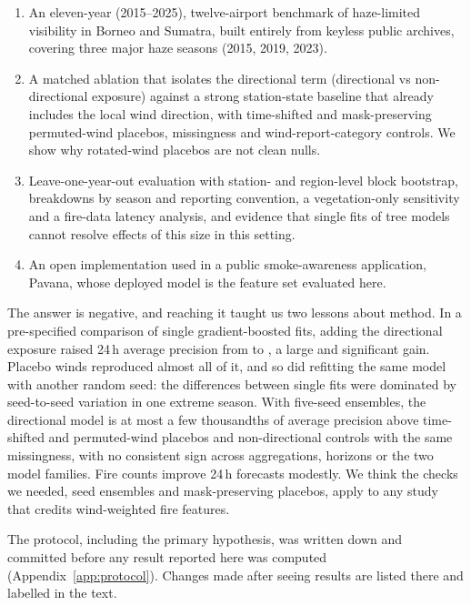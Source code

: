 \begin{enumerate}
  \item An eleven-year (2015--2025), twelve-airport benchmark of haze-limited visibility in Borneo
        and Sumatra, built entirely from keyless public archives, covering three major haze
        seasons (2015, 2019, 2023).
  \item A matched ablation that isolates the directional term (directional vs non-directional
        exposure) against a strong station-state baseline that already includes the local wind
        direction, with time-shifted and mask-preserving permuted-wind placebos, missingness and
        wind-report-category controls. We show why rotated-wind placebos are not clean nulls.
  \item Leave-one-year-out evaluation with station- and region-level block bootstrap, breakdowns by
        season and reporting convention, a vegetation-only sensitivity and a fire-data latency
        analysis, and evidence that single fits of tree models cannot resolve effects of this
        size in this setting.
  \item An open implementation used in a public smoke-awareness application, Pavana, whose
        deployed model is the feature set evaluated here.
\end{enumerate}

The answer is negative, and reaching it taught us two lessons about method. In a pre-specified
comparison of single gradient-boosted fits, adding the directional exposure raised 24\,h average
precision from  to , a large and significant gain. Placebo winds
reproduced almost all of it, and so did refitting the same model with another random seed: the
differences between single fits were dominated by seed-to-seed variation in one extreme season.
With five-seed ensembles, the directional model is at most a few thousandths of average precision
above time-shifted and permuted-wind placebos and non-directional controls with the same
missingness, with no consistent sign across aggregations, horizons or the two model families. Fire counts improve 24\,h forecasts modestly. We think
the checks we needed, seed ensembles and mask-preserving placebos, apply to any study that credits
wind-weighted fire features.

The protocol, including the primary hypothesis, was written down and committed before any result
reported here was computed (Appendix~\ref{app:protocol}). Changes made after seeing results are
listed there and labelled in the text.

